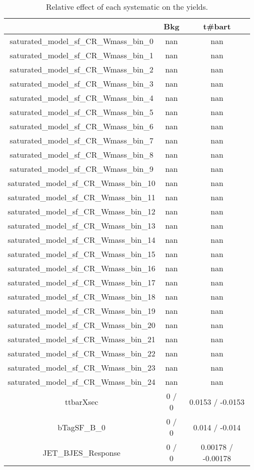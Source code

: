\documentclass[10pt]{article}
\begin{document}
\begin{table}[htbp]
\begin{center}
\begin{tabular}{|c|c|c|}
\hline 
      & Bkg      & t#bar{t} \\ 
\hline 
 saturated_model_sf_CR_Wmass_bin_0 &    nan    &    nan    \\ 
 saturated_model_sf_CR_Wmass_bin_1 &    nan    &    nan    \\ 
 saturated_model_sf_CR_Wmass_bin_2 &    nan    &    nan    \\ 
 saturated_model_sf_CR_Wmass_bin_3 &    nan    &    nan    \\ 
 saturated_model_sf_CR_Wmass_bin_4 &    nan    &    nan    \\ 
 saturated_model_sf_CR_Wmass_bin_5 &    nan    &    nan    \\ 
 saturated_model_sf_CR_Wmass_bin_6 &    nan    &    nan    \\ 
 saturated_model_sf_CR_Wmass_bin_7 &    nan    &    nan    \\ 
 saturated_model_sf_CR_Wmass_bin_8 &    nan    &    nan    \\ 
 saturated_model_sf_CR_Wmass_bin_9 &    nan    &    nan    \\ 
 saturated_model_sf_CR_Wmass_bin_10 &    nan    &    nan    \\ 
 saturated_model_sf_CR_Wmass_bin_11 &    nan    &    nan    \\ 
 saturated_model_sf_CR_Wmass_bin_12 &    nan    &    nan    \\ 
 saturated_model_sf_CR_Wmass_bin_13 &    nan    &    nan    \\ 
 saturated_model_sf_CR_Wmass_bin_14 &    nan    &    nan    \\ 
 saturated_model_sf_CR_Wmass_bin_15 &    nan    &    nan    \\ 
 saturated_model_sf_CR_Wmass_bin_16 &    nan    &    nan    \\ 
 saturated_model_sf_CR_Wmass_bin_17 &    nan    &    nan    \\ 
 saturated_model_sf_CR_Wmass_bin_18 &    nan    &    nan    \\ 
 saturated_model_sf_CR_Wmass_bin_19 &    nan    &    nan    \\ 
 saturated_model_sf_CR_Wmass_bin_20 &    nan    &    nan    \\ 
 saturated_model_sf_CR_Wmass_bin_21 &    nan    &    nan    \\ 
 saturated_model_sf_CR_Wmass_bin_22 &    nan    &    nan    \\ 
 saturated_model_sf_CR_Wmass_bin_23 &    nan    &    nan    \\ 
 saturated_model_sf_CR_Wmass_bin_24 &    nan    &    nan    \\ 
  ttbarXsec & 0 / 0 & 0.0153 / -0.0153 \\ 
  bTagSF_B_0 & 0 / 0 & 0.014 / -0.014 \\ 
  JET_BJES_Response & 0 / 0 & 0.00178 / -0.00178 \\ 
\hline 
\end{tabular} 
\caption{Relative effect of each systematic on the yields.} 
\end{center} 
\end{table} 
\end{document}
